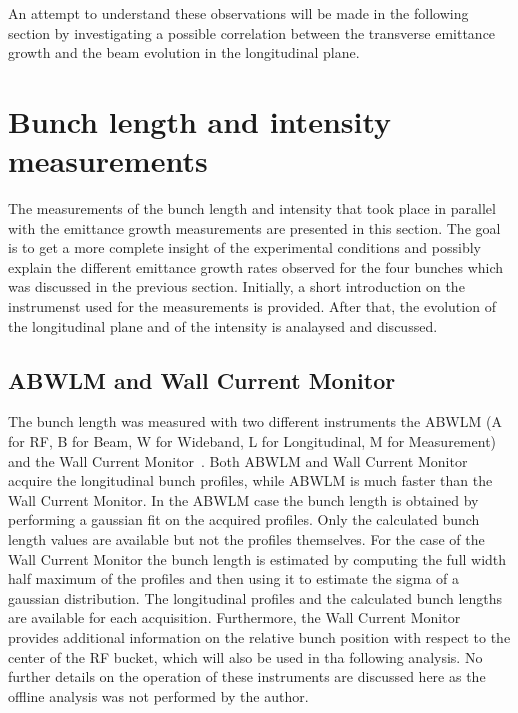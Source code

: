 An attempt to understand these observations will be made in the following section by investigating a possible correlation between the transverse emittance growth and the beam evolution in the longitudinal plane.

\section{Bunch length and intensity measurements}\label{sec:bunch_length_intensity_meas_2018}
The measurements of the bunch length and intensity that took place in parallel with the emittance growth measurements are presented in this section. The goal is to get a more complete insight of the experimental conditions and possibly explain the different emittance growth rates observed for the four bunches which was discussed in the previous section. Initially, a short introduction on the instrumenst used for the measurements is provided. After that, the evolution of the longitudinal plane and of the intensity is analaysed and discussed.

\subsection{ABWLM and Wall Current Monitor}\label{sec:ABWLM_WallCurrentMonitor}
The bunch length was measured with two different instruments the ABWLM (A for RF, B for Beam, W for Wideband, L for Longitudinal, M for Measurement)~\cite{ABWLM} and the Wall Current Monitor~\cite{Papotti:1124099}. Both ABWLM and Wall Current Monitor acquire the longitudinal bunch profiles, while ABWLM is much faster than the Wall Current Monitor. %
In the ABWLM case the bunch length is obtained by performing a gaussian fit on the acquired profiles. Only the calculated bunch length values are available but not the profiles themselves. For the case of the Wall Current Monitor the bunch length is estimated by computing the full width half maximum of the profiles and then using it to estimate the sigma of a gaussian distribution. The longitudinal profiles and the calculated bunch lengths are available for each acquisition. Furthermore, the Wall Current Monitor provides additional information on the relative bunch position with respect to the center of the RF bucket, which will also be used in tha following analysis. No further details on the operation of these instruments are discussed here as the offline analysis was not performed by the author. %



